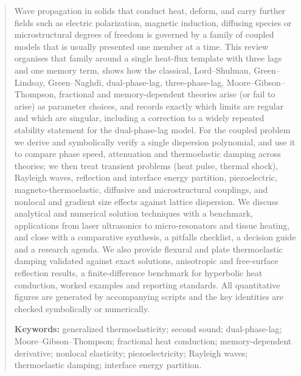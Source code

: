 \documentclass[12pt,a4paper]{article}
\begin{document}
\begin{abstract}
Wave propagation in solids that conduct heat, deform, and carry further fields such as electric polarization, magnetic induction, diffusing species or microstructural degrees of freedom is governed by a family of coupled models that is usually presented one member at a time. This review organises that family around a single heat-flux template with three lags and one memory term, shows how the classical, Lord--Shulman, Green--Lindsay, Green--Naghdi, dual-phase-lag, three-phase-lag, Moore--Gibson--Thompson, fractional and memory-dependent theories arise (or fail to arise) as parameter choices, and records exactly which limits are regular and which are singular, including a correction to a widely repeated stability statement for the dual-phase-lag model. For the coupled problem we derive and symbolically verify a single dispersion polynomial, and use it to compare phase speed, attenuation and thermoelastic damping across theories; we then treat transient problems (heat pulse, thermal shock), Rayleigh waves, reflection and interface energy partition, piezoelectric, magneto-thermoelastic, diffusive and microstructural couplings, and nonlocal and gradient size effects against lattice dispersion. We discuss analytical and numerical solution techniques with a benchmark, applications from laser ultrasonics to micro-resonators and tissue heating, and close with a comparative synthesis, a pitfalls checklist, a decision guide and a research agenda. We also provide flexural and plate thermoelastic damping validated against exact solutions, anisotropic and free-surface reflection results, a finite-difference benchmark for hyperbolic heat conduction, worked examples and reporting standards. All quantitative figures are generated by accompanying scripts and the key identities are checked symbolically or numerically.
\medskip

\noindent\textbf{Keywords:} generalized thermoelasticity; second sound; dual-phase-lag; Moore--Gibson--Thompson; fractional heat conduction; memory-dependent derivative; nonlocal elasticity; piezoelectricity; Rayleigh waves; thermoelastic damping; interface energy partition.

\tableofcontents
\newpage


\end{abstract}
\end{document}
